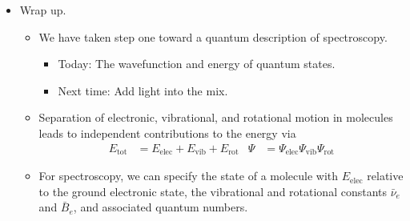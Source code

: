 \documentclass[../notes.tex]{subfiles}
\begin{document}
\begin{itemize}
\begin{itemize}
\begin{itemize}
            \item $E_\text{vib}$ is \SIrange{e2}{e3}{\per\centi\meter};
            \item $E_\text{rot}$ is \SIrange{e-1}{e1}{\per\centi\meter}.
            \item The scale of electronic differences, vs. vibrational differences, vs. rotational differences is shown in Figure \ref{fig:qmechEnergySpacing}.
        \end{itemize}
        \item We can summarize the state of the system from an energy point of view by specifying vibrational and rotational constants ($\bar{\nu}_e$ and $\bar{B}$) and their associated quantum numbers ($\nu$ and $J$).
    \end{itemize}
    \item Wrap up.
    \begin{itemize}
        \item We have taken step one toward a quantum description of spectroscopy.
        \begin{itemize}
            \item Today: The wavefunction and energy of quantum states.
            \item Next time: Add light into the mix.
        \end{itemize}
        \item Separation of electronic, vibrational, and rotational motion in molecules leads to independent contributions to the energy via
        \begin{align*}
            E_\text{tot} &= E_\text{elec}+E_\text{vib}+E_\text{rot}&
            \Psi &= \Psi_\text{elec}\Psi_\text{vib}\Psi_\text{rot}
        \end{align*}
        \item For spectroscopy, we can specify the state of a molecule with $E_\text{elec}$ relative to the ground electronic state, the vibrational and rotational constants $\bar{\nu}_e$ and $\bar{B}_e$, and associated quantum numbers.
    \end{itemize}
\end{itemize}
\end{document}
